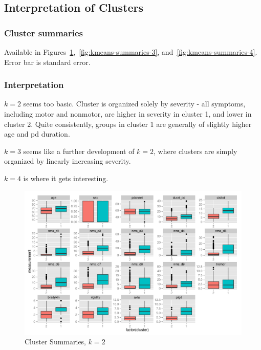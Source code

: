 \documentclass[letterpaper,12pt]{article}
\begin{document}
\subsection{Interpretation of Clusters}

\subsubsection{Cluster summaries}

Available in
Figures~\ref{fig:kmeans-summaries-2},~\ref{fig:kmeans-summaries-3},
and~\ref{fig:kmeans-summaries-4}. Error bar is standard error.

\subsubsection{Interpretation}

$k = 2$ seems too basic. Cluster is organized solely by severity - all
symptoms, including motor and nonmotor, are higher in severity in cluster 1,
and lower in cluster 2. Quite consistently, groups in cluster 1 are generally
of slightly higher age and pd duration.

$k = 3$ seems like a further development of $k = 2$, where clusters are simply
organized by linearly increasing severity.

$k = 4$ is where it gets interesting.

\begin{figure}[h]
  \centering
  \includegraphics[width=\linewidth]{kmeans-summaries-2.pdf}
  \caption{Cluster Summaries, $k = 2$}
  \label{fig:kmeans-summaries-2}
\end{figure}
\end{document}

